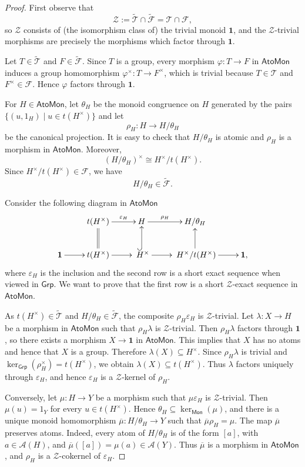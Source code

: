 \documentclass[a4paper,10pt,reqno]{amsart}
\theoremstyle{definition}
\theoremstyle{remark}
\newcommand{\AtoMon}{\mathsf{AtoMon}}
\newcommand{\Mon}{\mathsf{Mon}}
\newcommand{\Grp}{\mathsf{Grp}}
\newcommand{\A}{\mathscr A}
\newcommand{\Cal}[1]{\mathcal{#1}}
\begin{document}
\begin{proof}
First observe that
$$
\Cal Z:=\widetilde{\mathcal T}\cap\widetilde{\mathcal F}
=
\mathcal T\cap\mathcal F,
$$
so $\Cal Z$ consists of (the isomorphism class of) the trivial monoid $\mathbf 1$, and the $\Cal Z$-trivial morphisms are precisely the morphisms which factor through $\mathbf 1$.

Let $T\in\widetilde{\mathcal T}$ and
$F\in\widetilde{\mathcal F}$. Since $T$ is a group, every morphism
$\varphi:T\to F$ in $\AtoMon$ induces a group homomorphism $\varphi^\times\colon T\to F^\times$, which is trivial because $T\in\mathcal T$ and $F^\times\in\mathcal F$. Hence $\varphi$ factors through $\mathbf 1$.

For $H\in\AtoMon$, let $\theta_H$ be the monoid congruence on $H$ generated by the pairs $\{(u,1_H)\mid u \in t(H^\times)\}$ and let
$$
\rho_H:H\to H/\theta_H
$$
be the canonical projection. It is easy to check that $H/\theta_H$ is atomic and $\rho_H$ is a morphism in $\AtoMon$.
Moreover,
$$
(H/\theta_H)^\times
\cong
H^\times/t(H^\times).
$$
Since $H^\times/t(H^\times)\in\mathcal F$, we have
$$
H/\theta_H\in\widetilde{\mathcal F}.
$$

Consider the following diagram in $\AtoMon$
$$
\xymatrix{
 & t(H^\times) \ar[r]^-{\varepsilon_H} \ar@{=}[d] & H \ar[r]^-{\rho_H} & H/\theta_H & \\
\textbf{1} \ar[r] & t(H^\times) \ar[r] & \; H^\times \ar[r] \ar@{^(->}[u] & \; H^\times /t(H^\times) \ar[r] \ar[u] & \textbf{1},
}
$$
where $\varepsilon_H$ is the inclusion and the second row is a short exact sequence when viewed in $\Grp$. We want to prove that the first row is a short $\Cal Z$-exact sequence in $\AtoMon$.

As $t(H^\times)\in \widetilde{\Cal T}$ and $H/\theta_H\in\widetilde{\mathcal F}$, the composite $\rho_H\varepsilon_H$ is $\Cal Z$-trivial. Let $\lambda:X\to H$ be a morphism in $\AtoMon$ such that $\rho_H\lambda$ is $\Cal Z$-trivial. Then $\rho_H\lambda$ factors through $\mathbf 1$, so there exists a morphism $X\to\mathbf 1$ in $\AtoMon$. This implies that $X$ has no atoms and hence that $X$ is a group. Therefore $\lambda(X)\subseteq H^\times$. Since $\rho_H\lambda$ is trivial and $\ker_{\Grp}(\rho_H^\times)=t(H^\times)$, we obtain $\lambda(X)\subseteq t(H^\times)$. Thus $\lambda$ factors uniquely through $\varepsilon_H$, and hence $\varepsilon_H$ is a $\Cal Z$-kernel of $\rho_H$.

Conversely, let $\mu:H\to Y$ be a morphism such that $\mu \varepsilon_H$ is $\Cal Z$-trivial. Then
$\mu(u)=1_Y$ for every $u\in t(H^\times)$. Hence $\theta_H\subseteq\ker_{\Mon}(\mu)$, and there is a unique monoid homomorphism $\overline{\mu}:H/\theta_H\to Y$ such that $\overline{\mu}\rho_H=\mu$. The map $\overline{\mu}$ preserves atoms. Indeed, every atom of $H/\theta_H$ is of the form $[a]$, with $a\in\mathcal A(H)$, and $\overline{\mu}([a])=\mu(a)\in\A(Y)$.
Thus $\overline{\mu}$ is a morphism in $\AtoMon$, and $\rho_H$ is a $\Cal Z$-cokernel of $\varepsilon_H$.


\end{proof}
\end{document}
